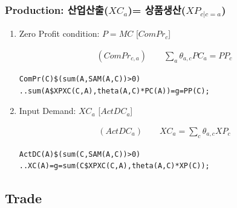 \documentclass[10pt,compress,slidetop,%
			   hyperref={unicode},xcolor={svgnames},%
			   t]{beamer}
\begin{document}
\begin{frame}[fragile]
\frametitle{Production: 산업산출($XC_a$)= 상품생산($XP_{c|c=a}$)}


\begin{scriptsize}
\begin{enumerate}
\item{Zero Profit condition: $P=MC$ [$ComPr_c$]}

\begin{eqnarray*}
(ComPr_{c,a})\qquad \sum_a\theta_{a,c}PC_a=PP_c
\end{eqnarray*}

\begin{verbatim}
ComPr(C)$(sum(A,SAM(A,C))>0)
..sum(A$XPXC(C,A),theta(A,C)*PC(A))=g=PP(C);
\end{verbatim}

\item{Input Demand: $XC_a$ [$ActDC_a$]}

\begin{eqnarray*}
(ActDC_a)\qquad XC_{a}=\sum_c \theta_{a,c}XP_c
\end{eqnarray*}

\begin{verbatim}
ActDC(A)$(sum(C,SAM(A,C))>0)
..XC(A)=g=sum(C$XPXC(C,A),theta(A,C)*XP(C));
\end{verbatim}

\end{enumerate}
\end{scriptsize}
\end{frame}
\subsection{Trade}
\end{document}
